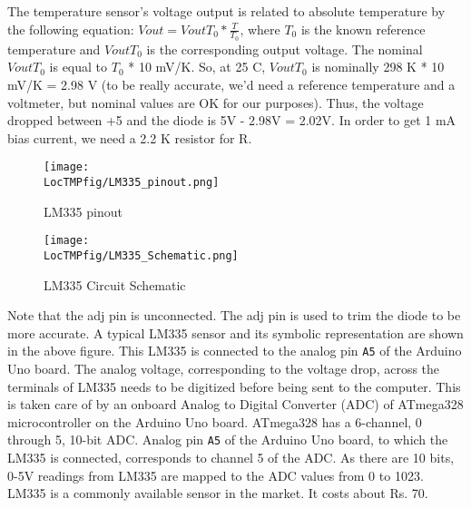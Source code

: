 The temperature sensor's voltage output is related to absolute
temperature by the following equation: \begin{math}Vout = VoutT_{0} *
\frac{T}{T_{0}} \end{math}, where \begin{math}T_{0}\end{math}
is the known reference temperature and \begin{math}
VoutT_{0}\end{math} is the corresponding output voltage. The
nominal \begin{math} VoutT_{0}\end{math} is equal to
\begin{math}T_{0}\end{math} * 10 mV/K. So, at 25 C, \begin{math}
VoutT_{0}\end{math} is nominally 298 K * 10 mV/K = 2.98 V
(to be really accurate, we'd need a reference temperature and a
voltmeter, but nominal values are OK for our purposes). Thus,
the voltage dropped between +5 and the diode is 5V - 2.98V =
2.02V.
In order to get 1 mA bias current, we need a 2.2 K resistor for
R.

\begin{figure}
  \centering
\texttt{[image: \\LocTMPfig/LM335\_pinout.png]}  \caption{LM335 pinout}
  \label{fig:lm335pinout}
\end{figure}

\begin{figure}
  \centering
\texttt{[image: \\LocTMPfig/LM335\_Schematic.png]}  \caption{LM335 Circuit Schematic}
  \label{fig:lm335schematic}
\end{figure}

Note that the adj pin is unconnected. The adj pin is used to
trim the diode to be more accurate. A typical LM335 sensor and
its symbolic representation are shown in the above figure. This
LM335 is connected to the analog pin {\tt A5} of the Arduino Uno
board. The analog voltage, corresponding to the voltage drop,
across the terminals of LM335 needs to be digitized before being
sent to the computer. This is taken care of by an onboard Analog
to Digital Converter (ADC) of ATmega328 microcontroller on the
Arduino Uno board. ATmega328 has a 6-channel, 0 through 5,
10-bit ADC. Analog pin {\tt A5} of the Arduino Uno board, to
which the LM335 is connected, corresponds to channel 5 of the
ADC. As there are 10 bits, 0-5V readings from LM335 are mapped
to the
ADC values from 0 to 1023. LM335 is a commonly available sensor
in the market. It costs about Rs. 70.

